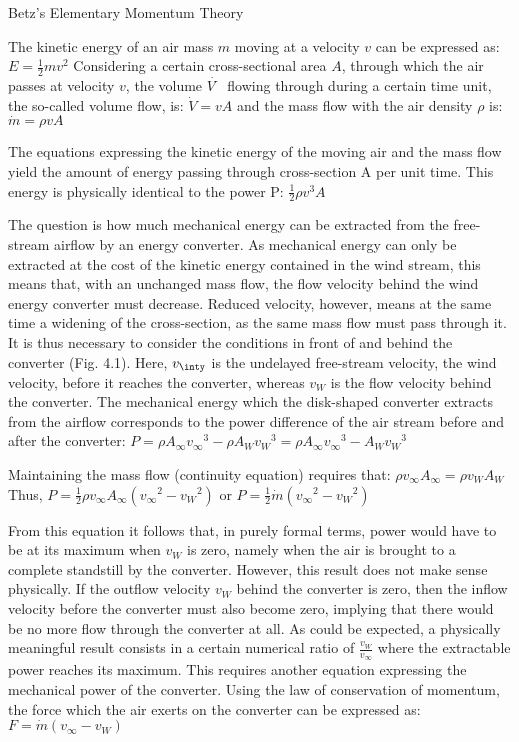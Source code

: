 Betz’s Elementary Momentum Theory

The kinetic energy of an air mass $m$ moving at a velocity $v$ can be expressed as:
$E = \frac{1}{2}mv^2$
Considering a certain cross-sectional area $A$, through which the air passes at velocity $v$, the volume $\dot{V̇}$ flowing through during a certain time unit, the so-called volume flow, is:
$\dot{V} = vA$
and the mass flow with the air density $\rho$ is:
$\dot{m} = \rho v A $

The equations expressing the kinetic energy of the moving air and the mass flow yield the amount of energy passing through cross-section A per unit time. This energy is physically identical to the power P:
$\frac{1}{2}\rho {v}^3 A $

The question is how much mechanical energy can be extracted from the free-stream airflow by an energy converter. As mechanical energy can only be extracted at the cost of the kinetic energy contained in the wind stream, this means that, with an unchanged mass flow, the flow velocity behind the wind energy converter must decrease. Reduced velocity, however, means at the same time a widening of the cross-section, as the same mass flow must pass through it. It is thus necessary to consider the conditions in front of and behind the converter (Fig. 4.1).
Here, $v_{\inty}$ is the undelayed free-stream velocity, the wind velocity, before it reaches the converter, whereas $v_{W}$ is the flow velocity behind the converter. The mechanical energy which the disk-shaped converter extracts from the airflow corresponds to the power difference of the air stream before and after the converter:
$P = \rho A_{\infty} {v_{\infty}}^3 − \rho A_W {v_W}^3 = \rho A_{\infty} {v_{\infty}}^3 − A_W {v_W}^3$

Maintaining the mass flow (continuity equation) requires that:
$\rho v_{\infty} A_{\infty} = \rho v_{W} A_{W}$
Thus,
$P = \frac{1}{2}\rho v_{\infty}A_{\infty}({v_{\infty}}^2-{v_W}^2)$
or 
$P = \frac{1}{2}\dot{m}({v_{\infty}}^2-{v_W}^2)$

From this equation it follows that, in purely formal terms, power would have to be at its maximum when $v_W$ is zero, namely when the air is brought to a complete standstill by the converter. However, this result does not make sense physically. If the outflow velocity $v_W$ behind the converter is zero, then the inflow velocity before the converter must also become zero, implying that there would be no more flow through the converter at all. As could be expected, a physically meaningful result consists in a certain numerical ratio of $\frac{v_{W}}{v_{\infty}}$ where the extractable power reaches its maximum.
This requires another equation expressing the mechanical power of the converter. Using the law of conservation of momentum, the force which the air exerts on the converter can be expressed as:
$F = \dot{m}(v_{\infty} - v_W)$

